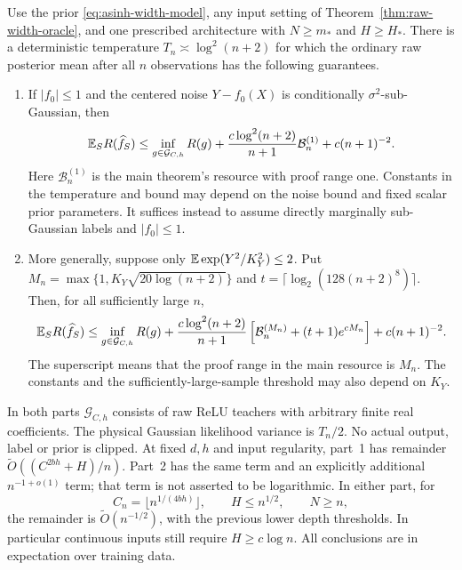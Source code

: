\begin{theorem}
\label{thm:asinh-width}
Use the prior \eqref{eq:asinh-width-model}, any input setting of
Theorem~\ref{thm:raw-width-oracle}, and one prescribed architecture with
$N\ge m_*$ and $H\ge H_*$.  There is a deterministic temperature
$T_n\asymp\log^2(n+2)$ for which the ordinary raw posterior mean after
all $n$ observations has the following guarantees.
\begin{enumerate}
\item If $|f_0|\le1$ and the centered noise $Y-f_0(X)$ is conditionally
$\sigma^2$-sub-Gaussian, then
\begin{equation}\label{eq:asinh-bounded-mean-width}
 \mathbb E_S R(\widehat f_S)
 \le\inf_{g\in\mathcal G_{C,h}}R(g)
       +\frac{c\log^2(n+2)}{n+1}\mathcal B_n^{(1)}
       +c(n+1)^{-2}.
\end{equation}
Here $\mathcal B_n^{(1)}$ is the main theorem's resource with proof range
one.  Constants in the temperature and bound may depend on the noise
bound and fixed scalar prior parameters.  It suffices instead to assume
directly marginally sub-Gaussian labels and $|f_0|\le1$.
\item More generally, suppose only
$\mathbb E\exp(Y^2/K_Y^2)\le2$.  Put
$M_n=\max\{1,K_Y\sqrt{20\log(n+2)}\}$ and
$t=\lceil\log_2(128(n+2)^8)\rceil$.
Then, for all sufficiently large $n$,
\begin{equation}\label{eq:asinh-marginal-width}
 \mathbb E_S R(\widehat f_S)
 \le\inf_{g\in\mathcal G_{C,h}}R(g)
 +\frac{c\log^2(n+2)}{n+1}
       \left[\mathcal B_n^{(M_n)}+(t+1)e^{cM_n}\right]
 +c(n+1)^{-2}.
\end{equation}
The superscript means that the proof range in the main resource is
$M_n$.  The constants and the sufficiently-large-sample threshold may
also depend on $K_Y$.
\end{enumerate}
In both parts $\mathcal G_{C,h}$ consists of raw ReLU teachers with
arbitrary finite real coefficients.  The physical Gaussian likelihood
variance is $T_n/2$.  No actual output, label or prior is clipped.
At fixed $d,h$ and input regularity, part~1 has remainder
$\widetilde O((C^{2bh}+H)/n)$.  Part~2 has the same term and an explicitly
additional $n^{-1+o(1)}$ term; that term is not asserted to be logarithmic.
In either part, for
\[
 C_n=\lfloor n^{1/(4bh)}\rfloor,\qquad H\le n^{1/2},\qquad N\ge n,
\]
the remainder is $\widetilde O(n^{-1/2})$, with the previous lower depth
thresholds.  In particular continuous inputs still require
$H\ge c\log n$.  All conclusions are in expectation over training data.
\end{theorem}
